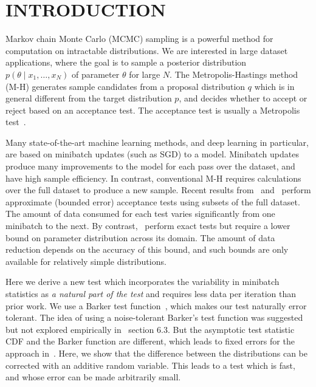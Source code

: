 \documentclass[twoside]{article} \usepackage{aistats2017}
\begin{document}
\section{INTRODUCTION}\label{sec:introduction}

Markov chain Monte Carlo (MCMC) sampling is a powerful method for computation on
intractable distributions. We are interested in large dataset applications,
where the goal is to sample a posterior distribution $p(\theta \mid x_1, \ldots,
x_N)$ of parameter $\theta$ for large $N$.  The Metropolis-Hastings method (M-H)
generates sample candidates from a proposal distribution $q$ which is in general
different from the target distribution $p$, and decides whether to accept or
reject based on an acceptance test. The acceptance test is usually a Metropolis
test~\citep{Metropolis1953, hastings70}.

Many state-of-the-art machine learning methods, and deep learning in particular,
are based on minibatch updates (such as SGD) to a model.  Minibatch updates
produce many improvements to the model for each pass over the dataset, and have
high sample efficiency.  In contrast, conventional M-H requires calculations
over the full dataset to produce a new sample.  Recent results
from~\citet{cutting_mh_2014} and~\citet{icml2014c1_bardenet14} perform
approximate (bounded error) acceptance tests using subsets of the full dataset.
The amount of data consumed for each test varies significantly from one
minibatch to the next. By contrast,~\citet{conf/uai/MaclaurinA14,TallData15}
perform exact tests but require a lower bound on parameter distribution across
its domain.  The amount of data reduction depends on the accuracy of this bound,
and such bounds are only available for relatively simple distributions.

Here we derive a new test which incorporates the variability in minibatch
statistics as {\em a natural part of the test} and requires less data per
iteration than prior work. We use a Barker test function~\citep{Barker65}, which
makes our test naturally error tolerant. The idea of using a noise-tolerant
Barker's test function was suggested but not explored empirically
in~\citet{TallData15} section 6.3. But the asymptotic test statistic CDF and the
Barker function are different, which leads to fixed errors for the approach
in~\citet{TallData15}. Here, we show that the difference between the
distributions can be corrected with an additive random variable. This leads to a
test which is fast, and whose error can be made arbitrarily small.
\end{document}
